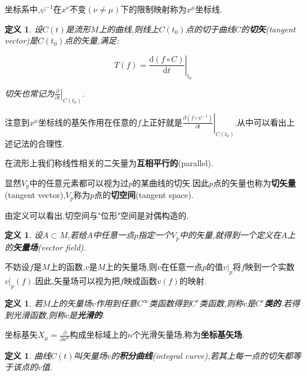 \documentclass[UTF8]{article}
\newcommand{\D}{\mathrm{d}}
\begin{document}
	坐标系中,$\psi^{-1}$在$x^{\nu}$不变$(\nu \ne \mu)$下的限制映射称为$x^{\mu}$坐标线.
	
	\newtheorem{tangentVector}{定义}
	
	\begin{tangentVector}
		
		设$C(t)$是流形$M$上的曲线,则线上$C(t_{0})$点的切于曲线$C$的\textbf{切矢}(tangent vector)是$C(t_{0})$点的矢量,满足:
		
		\[T(f) = \left.\frac{\D(f \circ C)}{\D t}\right|_{t_0}\]
		
		切矢也常记为$\left.\frac{\partial}{\partial t}\right|_{C(t_0)}$.
		
	\end{tangentVector}
	
	注意到$x^{\mu}$坐标线的基矢作用在任意的$f$上正好就是$\left.\frac{\partial (f \circ \psi^{-1})}{\partial t}\right|_{C(t_0)}$,从中可以看出上述记法的合理性.
	
	在流形上我们称线性相关的二矢量为\textbf{互相平行的}(parallel).
	
	显然$V_{p}$中的任意元素都可以视为过$p$的某曲线的切矢.因此$p$点的矢量也称为\textbf{切矢量}(tangent vector),$V_{p}$称为$p$点的\textbf{切空间}(tangent space).
	
	由定义可以看出,切空间与"位形"空间是对偶构造的.
	
	\newtheorem*{vectorField}{定义}
	
	\begin{vectorField}
		设$A \subset M$,若给$A$中任意一点$p$指定一个$V_{p}$中的矢量,就得到一个定义在$A$上的\textbf{矢量场}(vector field).
	\end{vectorField}
	
	不妨设$f$是$M$上的函数,$v$是$M$上的矢量场,则$v$在任意一点$p$的值$v|_{p}$将$f$映到一个实数$v|_{p}(f)$.因此,矢量场可以视为把$f$映成函数$v(f)$的映射.
	
	\newtheorem{CrVectorField}{定义}
	
	\begin{CrVectorField}
		若$M$上的矢量场$v$作用到任意$C^{\infty}$类函数得到$C^{r}$类函数,则称$v$是\textbf{$C^{r}$类的}.若得到光滑函数,则称$v$是\textbf{光滑的}.
	\end{CrVectorField}
	
	坐标基矢$X_{\mu} = \frac{\partial}{\partial x^{\mu}}$构成坐标域上的$n$个光滑矢量场,称为\textbf{坐标基矢场}.
	
	\newtheorem{integralCurve}{定义}
	
	\begin{integralCurve}
		曲线$C(t)$叫矢量场$v$的\textbf{积分曲线}(integral curve),若其上每一点的切矢都等于该点的$v$值.
	\end{integralCurve}
	
\end{document}
